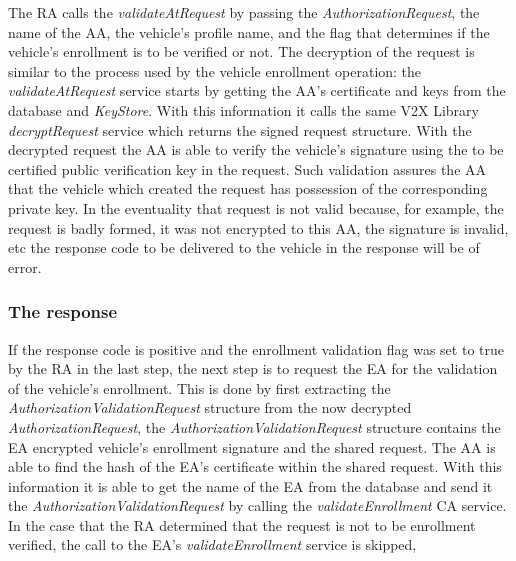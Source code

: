The RA calls the \textit{validateAtRequest} by passing the \textit{AuthorizationRequest}, the name of the AA, the vehicle's profile name, and the flag that determines if the vehicle's enrollment is to be verified or not. The decryption of the request is similar to the process used by the vehicle enrollment operation: the \textit{validateAtRequest} service starts by getting the AA's certificate and keys from the database and \textit{KeyStore}. With this information it calls the same V2X Library \textit{decryptRequest} service which returns the signed request structure. With the decrypted request the AA is able to verify the vehicle's signature using the to be certified public verification key in the request. Such validation assures the AA that the vehicle which created the request has possession of the corresponding private key. In the eventuality that request is not valid because, for example, the request is badly formed, it was not encrypted to this AA, the signature is invalid, etc the response code to be delivered to the vehicle in the response will be of error.

\subsubsection{The response}
If the response code is positive and the enrollment validation flag was set to true by the RA in the last step, the next step is to request the EA for the validation of the vehicle's enrollment. This is done by first extracting the \textit{AuthorizationValidationRequest} structure from the now decrypted \textit{AuthorizationRequest}, the \textit{AuthorizationValidationRequest} structure contains the EA encrypted vehicle's enrollment signature and the shared request. The AA is able to find the hash of the EA's certificate within the shared request. With this information it is able to get the name of the EA from the database and send it the \textit{AuthorizationValidationRequest} by calling the \textit{validateEnrollment} CA service. In the case that the RA determined that the request is not to be enrollment verified, the call to the EA's \textit{validateEnrollment} service is skipped, 


